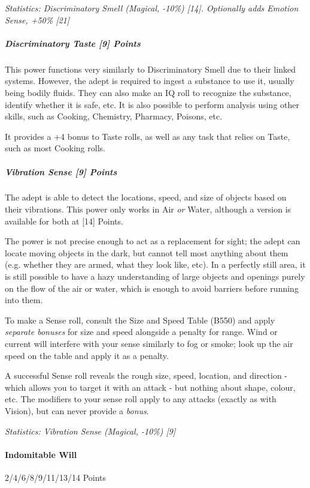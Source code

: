 \begin{multicols*}{3}
		\textcolor{OliveGreen}{\textit{Statistics: Discriminatory Smell (Magical, -10\%) [14]. Optionally adds Emotion Sense, +50\% [21] }}	
		
	\subparagraph{Discriminatory Taste [9] Points}
	
		This power functions very similarly to Discriminatory Smell due to their linked systems. However, the adept is required to ingest a substance to use it, usually being bodily fluids. They can also make an IQ roll to recognize the substance, identify whether it is safe, etc. It is also possible to perform analysis using other skills, such as Cooking, Chemistry, Pharmacy, Poisons, etc.
		
		It provides a +4 bonus to Taste rolls, as well as any task that relies on Taste, such as most Cooking rolls.
		
	\subparagraph{Vibration Sense [9] Points}
	
		The adept is able to detect the locations, speed, and size of objects based on their vibrations. This power only works in Air \textit{or} Water, although a version is available for both at [14] Points.
		
		The power is not precise enough to act as a replacement for sight; the adept can locate moving objects in the dark, but cannot tell most anything about them (e.g. whether they are armed, what they look like, etc). In a perfectly still area, it is still possible to have a hazy understanding of large objects and openings purely on the flow of the air or water, which is enough to avoid barriers before running into them.
		
		To make a Sense roll, consult the Size and Speed Table (B550) and apply \textit{separate bonuses} for size and speed alongside a penalty for range. Wind or current will interfere with your sense similarly to fog or smoke; look up the air speed on the table and apply it as a penalty.
		
		A successful Sense roll reveals the rough size, speed, location, and direction - which allows you to target it with an attack - but nothing about shape, colour, etc. The modifiers to your sense roll apply to any attacks (exactly as with Vision), but can never provide a \textit{bonus}.  
	
		\textcolor{OliveGreen}{\textit{Statistics: Vibration Sense (Magical, -10\%) [9] }}
	
	\paragraph{Indomitable Will}
	\begin{flushright}
		2/4/6/8/9/11/13/14 Points
	\end{flushright}


\end{multicols*}
